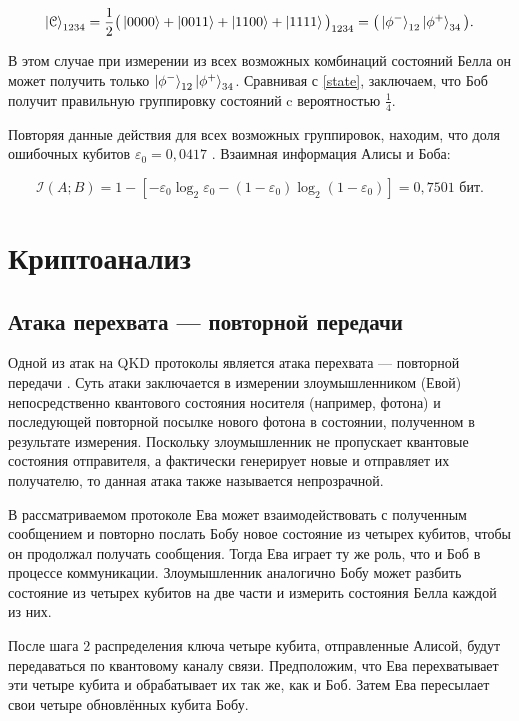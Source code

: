 \documentclass[a4paper,11pt]{article}
\begin{document}
\begin{equation*}
\ket{\mathcal{C}}_{1234} = \dfrac{1}{2} \big(\ket{0000} + \ket{0011}
 + \ket{1100} + \ket{1111} \big)_{1234} = \big(\ket{\phi^-}_{12} \ket{\phi^+}_{34}\big).
\end{equation*}

В этом случае при измерении из всех возможных комбинаций состояний Белла он может получить только $\ket{\phi^-}_{12} \ket{\phi^+}_{34}$. Сравнивая с \eqref{state}, заключаем, что Боб получит правильную группировку состояний c вероятностью $\frac{1}{4}$.

Повторяя данные действия для всех возможных группировок, находим, что доля ошибочных кубитов $\varepsilon_0 = 0,0417$ \cite{base}. Взаимная информация Алисы и Боба:

\begin{equation}\label{mutual_ab}
\mathcal{I}(A; B) = 1 - [- \varepsilon_0 \log_2 \varepsilon_0 -(1-\varepsilon_0)\log_2(1-\varepsilon_0) ] = 0,7501 \text{ бит}.
\end{equation}

\section{Криптоанализ}\label{analize}

\subsection{Атака перехвата --- повторной передачи}
Одной из атак на QKD протоколы является атака перехвата --- повторной передачи \cite{ira1, ira2, ira3}. Суть атаки заключается в измерении злоумышленником (Евой) непосредственно квантового состояния носителя (например, фотона) и последующей повторной посылке нового фотона в состоянии, полученном в результате измерения. Поскольку злоумышленник не пропускает квантовые состояния отправителя, а фактически генерирует новые и отправляет их получателю, то данная атака также называется непрозрачной. 

В рассматриваемом протоколе Ева может взаимодействовать с полученным сообщением и повторно послать Бобу новое состояние из четырех кубитов, чтобы он продолжал получать сообщения. Тогда Ева играет ту же роль, что и Боб в процессе коммуникации. Злоумышленник аналогично Бобу может разбить состояние из четырех кубитов на две части и измерить состояния Белла каждой из них.

После шага $2$ распределения ключа четыре кубита, отправленные Алисой, будут передаваться по квантовому каналу связи. Предположим, что Ева перехватывает эти четыре кубита и обрабатывает их так же, как и Боб. Затем Ева пересылает свои четыре обновлённых кубита Бобу. 
\end{document}
